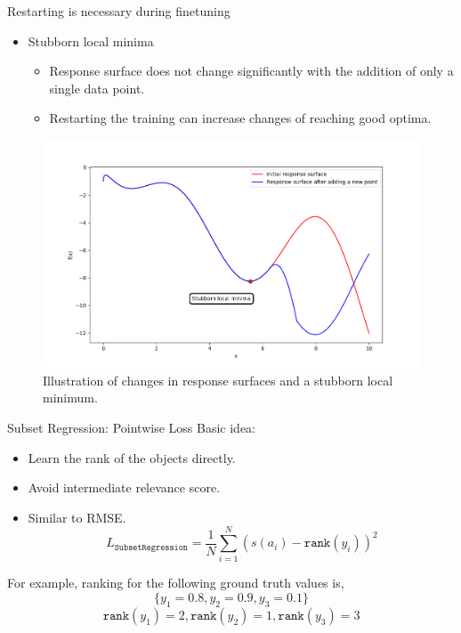 \documentclass{beamer}
\begin{document}
\begin{frame}[t]{Restarting is necessary during finetuning}
\begin{itemize}
\item Stubborn local minima
\begin{itemize}
\item Response surface does not change significantly with the addition of only a single data point.
\item Restarting the training can increase changes of reaching good optima.
\end{itemize} 
\end{itemize}

\begin{figure}[htb]
  \centering
    \includegraphics[scale=0.37]{images/localMinima}
    \caption{Illustration of changes in response surfaces and a stubborn local minimum.}
    \label{fig:localMinima}
\end{figure}

\end{frame}


\begin{frame}[t]{Subset Regression: Pointwise Loss}
Basic idea:~\cite{subsetregressionpaper}
\begin{itemize}
\item Learn the rank of the objects directly.
\item Avoid intermediate relevance score.
\item Similar to RMSE.
$$
L_{\texttt{SubsetRegression}} = \frac{1}{N} \sum\limits_{i=1}^{N} (s(a_i) - \texttt{rank}(y_i))^2
$$
\end{itemize}


For example,  ranking for the following ground truth values is, 
$$
\{y_1 = 0.8, y_2 = 0.9, y_3 = 0.1\}
$$
$$
\texttt{rank}(y_1) = 2,  \texttt{rank}(y_2) = 1,  \texttt{rank}(y_3) = 3
$$

\end{frame}
\end{document}
